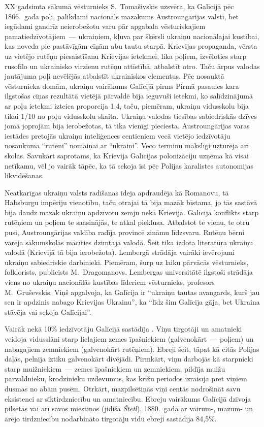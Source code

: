 \documentclass[twoside,a5paper,12pt,fleqn,openany]{extbook}
\newcommand{\pltxti}[1]{\textit{\textpolish{#1}}}
\begin{document}
XX gadsimta sākumā vēsturnieks S.~Tomašivskis uzsvēra, ka Galīcijā pēc 1866.~gada poļi, palikdami nacionāls mazākums Austroungārijas valstī, bet iegūdami gandrīz neierobežotu varu pār apgabala vēsturiskajiem pamatiedzīvotājiem~--- ukraiņiem, kļuva par šķērsli ukraiņu nacionālajai kustībai, kas noveda pie pastāvīgām cīņām abu tautu starpā. Krievijas propaganda, vērsta uz vietējo rutēņu piesaistīšanu Krievijas ietekmei, lika poļiem, izvēloties starp rusofīlo un ukrainisko virzienu rutēņu attīstībā, atbalstīt otro. Taču ārpus valodas jautājuma poļi nevēlējās atbalstīt ukrainiskos elementus. Pēc nosauktā vēsturnieka domām, ukraiņu vairākums Galīcijā pirms Pirmā pasaules kara ilgstošas cīņas rezultātā vietējā pārvaldē bija ieguvuši ietekmi, ko salīdzinājumā ar poļu ietekmi izteica proporcija 1:4, taču, piemēram, ukraiņu vidusskolu bija tikai 1/10 no poļu vidusskolu skaita. Ukraiņu valodas tiesības sabiedriskās dzīves jomā joprojām bija ierobežotas, tā tika vienīgi pieciesta. Austroungārijas varas iestādes pretojās ukraiņu inteliģences centieniem vecā vietējo iedzīvotāju nosaukuma ``rutēņi'' nomaiņai ar ``ukraiņi''. Veco terminu mākslīgi uzturēja arī skolas. Savukārt saprotams, ka Krievija Galīcijas polonizāciju uzņēma kā visai netīkamu, vēl jo vairāk tāpēc, ka tā sekoja īsi pēc Polijas karalistes autonomijas likvidēšanas.

Neatkarīgas ukraiņu valsts radīšanas ideja apdraudēja kā Romanovu, tā Habsburgu impēriju vienotību, taču otrajai tā bija mazāk bīstama, jo tās sastāvā bija daudz mazāk ukraiņu apdzīvotu zemju nekā Krievijā. Galīcijā konflikts starp rutēņiem un poļiem te saasinājās, te atkal pieklusa. Atbalstot te vienu, te otru pusi, Austroungārijas valdība radīja provincē zināmu līdzsvaru. Rutēņu bērni varēja sākumskolās mācīties dzimtajā valodā. Šeit tika izdota literatūra ukraiņu valodā (Krievijā tā bija ierobežota). Lembergā strādāja vairāki ievērojami ukraiņu sabiedriskie darbinieki. Piemēram, šurp uz laiku pārvācās vēsturnieks, folklorists, publicists M.~Dragomanovs. Lembergas universitātē ilgstoši strādāja viens no ukraiņu nacionālās kustības līderiem vēsturnieks, profesors M.~Gruševskis. Viņš apgalvoja, ka Galīcija ir ``ukraiņu tautas avangards, kurš jau sen ir apdzinis nabago Krievijas Ukrainu'', ka ``līdz šim Galīcija gāja, bet Ukraina stāvēja vai sekoja Galīcijai''.

Vairāk nekā 10\% iedzīvotāju Galīcijā sastādīja . Viņu tirgotāji un amatnieki veidoja vidusslāni starp lielajiem zemes īpašniekiem (galvenokārt~--- poļiem) un nabagajiem zemniekiem (galvenokārt rutēņiem). Ebreji šeit, tāpat kā citās Polijas daļās, pelnīja iztiku galvenokārt divējādi. Pirmkārt, viņu darbojās kā starpnieki starp muižniekiem~--- zemes īpašniekiem un zemniekiem, pildīja muižu pārvaldnieku, krodzinieku uzdevumus, kas krīžu periodos izraisīja pret viņiem dusmas no abām pusēm. Otrkārt, mazpilsētiņās viņi centās nodrošināt savu eksistenci ar sīktirdzniecību un amatniecību. Ebreju vairākums Galīcijā dzīvoja pilsētās vai arī savos miestiņos (jidišā \pltxti{Štetl}). 1880.~gadā ar vairum-, mazum- un ārējo tirdzniecību nodarbināto tirgotāju vidū ebreji sastādīja 84,5\%.
\end{document}
